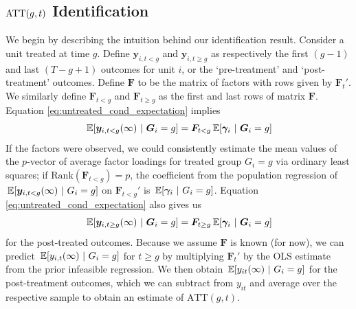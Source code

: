 \documentclass[12pt]{article}
\begin{document}
\subsection{\texorpdfstring{$\text{ATT}(g,t)$}{ATT(g,t)} Identification}\label{sec:ATT_identification}

We begin by describing the intuition behind our identification result. Consider a unit treated at time $g$. Define $\bm y_{i,t<g}$ and $\bm y_{i,t\geq g}$ as respectively the first $(g-1)$ and last $(T-g+1)$ outcomes for unit $i$, or the `pre-treatment' and `post-treatment' outcomes. Define $\bm{F}$ to be the matrix of factors with rows given by $\bm{F}_t'$. We similarly define $\bm{F}_{t < g}$ and $\bm{F}_{t \geq g}$ as the first and last rows of matrix $\bm{F}$. Equation \eqref{eq:untreated_cond_expectation} implies
\begin{equation}
  \expec{\bm y_{i,t < g}(\infty)}{ \bm G_i = g} = \bm{F}_{t < g} \expec{\bm \gamma_i}{\bm G_i = g}
\end{equation}
If the factors were observed, we could consistently estimate the mean values of the $p$-vector of average factor loadings for treated group $G_i = g$ via ordinary least squares; if $\text{Rank}(\bm{F}_{t < g}) = p$, the coefficient from the population regression of $\expec{\bm y_{i,t < g}(\infty) }{ G_i = g}$ on $\bm{F}_{t < g}'$ is $\expec{\bm \gamma_i}{G_i = g}$. Equation \eqref{eq:untreated_cond_expectation} also gives us 
\begin{equation}
  \expec{\bm y_{i,t \geq g}(\infty)}{ \bm G_i = g} = \bm{F}_{t \geq g} \expec{\bm \gamma_i}{\bm G_i = g}
\end{equation}
for the post-treated outcomes. Because we assume $\bm{F}$ is known (for now), we can predict $\expec{ y_{i,t}(\infty)}{G_i = g}$ for $t \geq g$ by multiplying $\bm{F}_t'$ by the OLS estimate from the prior infeasible regression. We then obtain $\expec{y_{it}(\infty)}{G_i = g}$ for the post-treatment outcomes, which we can subtract from $y_{i t}$ and average over the respective sample to obtain an estimate of $\text{ATT}(g,t)$. 
\end{document}
